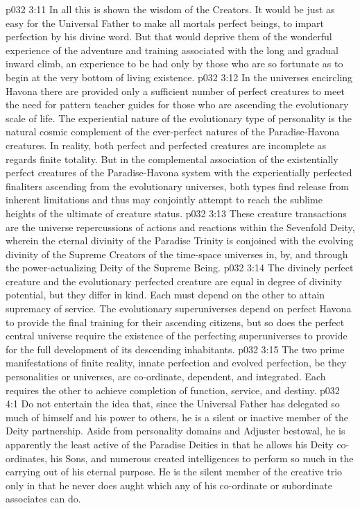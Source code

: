 \vs p032 3:11 In all this is shown the wisdom of the Creators. It would be just as easy for the Universal Father to make all mortals perfect beings, to impart perfection by his divine word. But that would deprive them of the wonderful experience of the adventure and training associated with the long and gradual inward climb, an experience to be had only by those who are so fortunate as to begin at the very bottom of living existence.
\vs p032 3:12 In the universes encircling Havona there are provided only a sufficient number of perfect creatures to meet the need for pattern teacher guides for those who are ascending the evolutionary scale of life. The experiential nature of the evolutionary type of personality is the natural cosmic complement of the ever\hyp{}perfect natures of the Paradise\hyp{}Havona creatures. In reality, both perfect and perfected creatures are incomplete as regards finite totality. But in the complemental association of the existentially perfect creatures of the Paradise\hyp{}Havona system with the experientially perfected finaliters ascending from the evolutionary universes, both types find release from inherent limitations and thus may conjointly attempt to reach the sublime heights of the ultimate of creature status.
\vs p032 3:13 These creature transactions are the universe repercussions of actions and reactions within the Sevenfold Deity, wherein the eternal divinity of the Paradise Trinity is conjoined with the evolving divinity of the Supreme Creators of the time\hyp{}space universes in, by, and through the power\hyp{}actualizing Deity of the Supreme Being.
\vs p032 3:14 The divinely perfect creature and the evolutionary perfected creature are equal in degree of divinity potential, but they differ in kind. Each must depend on the other to attain supremacy of service. The evolutionary superuniverses depend on perfect Havona to provide the final training for their ascending citizens, but so does the perfect central universe require the existence of the perfecting superuniverses to provide for the full development of its descending inhabitants.
\vs p032 3:15 The two prime manifestations of finite reality, innate perfection and evolved perfection, be they personalities or universes, are co\hyp{}ordinate, dependent, and integrated. Each requires the other to achieve completion of function, service, and destiny.
\vs p032 4:1 Do not entertain the idea that, since the Universal Father has delegated so much of himself and his power to others, he is a silent or inactive member of the Deity partnership. Aside from personality domains and Adjuster bestowal, he is apparently the least active of the Paradise Deities in that he allows his Deity co\hyp{}ordinates, his Sons, and numerous created intelligences to perform so much in the carrying out of his eternal purpose. He is the silent member of the creative trio only in that he never does aught which any of his co\hyp{}ordinate or subordinate associates can do.

